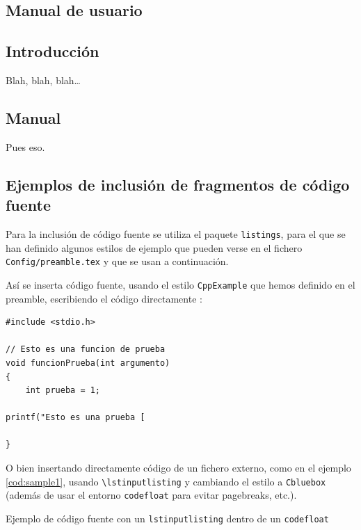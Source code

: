 \documentclass[spanish,openright]{book}
\begin{document}
\begin{appendices}



\chapter{Manual de usuario}
\label{cha:manual-de-usuario}

\section{Introducción}
\label{sec:intro-manual-de-usuario}

Blah, blah, blah\ldots


\section{Manual}
\label{sec:sec-manual-de-usuario}

Pues eso.


\section{Ejemplos de inclusión de fragmentos de código fuente}
\label{sec:codigo-fuente}

Para la inclusión de código fuente se utiliza el paquete
\texttt{listings}, para el que se han definido algunos estilos de
ejemplo que pueden verse en el fichero \texttt{Config/preamble.tex} y
que se usan a continuación.

Así se inserta código fuente, usando el estilo \texttt{CppExample} que
hemos definido en el preamble, escribiendo el código directamente :

\begin{lstlisting}[style=CppExample]
#include <stdio.h>

// Esto es una funcion de prueba
void funcionPrueba(int argumento)
{	
	int prueba = 1;

printf("Esto es una prueba [

}
\end{lstlisting}

O bien insertando directamente código de un fichero externo, como en el
ejemplo \ref{cod:sample1}, usando
\texttt{\textbackslash{}lstinputlisting} y cambiando el estilo a
\texttt{Cbluebox} (además de usar el entorno \texttt{codefloat} para
evitar pagebreaks, etc.).

\begin{codefloat}

\caption{Ejemplo de código fuente con un \texttt{lstinputlisting} dentro
de un \texttt{codefloat}}
\label{cod:sample1}
\end{codefloat}



\end{appendices}
\end{document}
